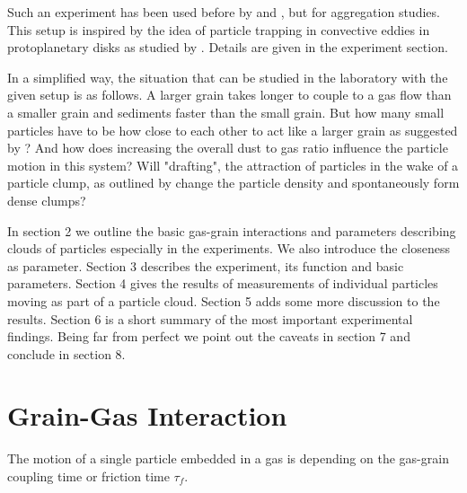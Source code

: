 Such an experiment has been used before by \citet{blum1998} and \citet{PoppeBlum1997}, but for aggregation studies. This setup is inspired by the idea of particle trapping in convective eddies in protoplanetary disks as studied by \citet{klahr1997}. Details are given in the experiment section.


In a simplified way, the situation that can be studied in the laboratory with the given setup is as follows. A larger grain takes longer to couple to a gas flow than a smaller grain and 
sediments faster than the small grain.
But how many small particles have to be how close to each other to act like a larger grain {as suggested by \citet{JohansenYoudin2007}}? 
And how does increasing the overall dust to gas ratio influence the particle motion in this 
system? {Will "drafting", the attraction of particles in the wake of a particle clump, as outlined by \citet{Lambrechts2016} change the particle density and spontaneously form dense clumps?}

{In section 2 we outline the basic gas-grain interactions and parameters describing clouds of particles especially in the experiments. We also introduce the closeness as parameter. Section 3 describes the experiment, its function and basic parameters. Section 4 gives the results of measurements of individual particles moving as part of a particle cloud. Section 5 adds some more discussion to the results. Section 6 is a short summary of the most important experimental findings. Being far from perfect we point out the caveats in section 7 and conclude in section 8.}


\section{Grain-Gas Interaction}

The motion of a single particle embedded in a gas is depending on the gas-grain coupling time or friction time $\tau_f$. 




